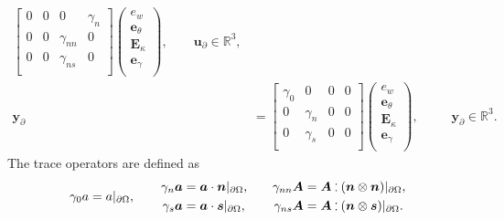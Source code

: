 \begin{subequations}
\begin{align}
	\begin{bmatrix}
	{0} &  {0} & {0} & \gamma_{n} \\
	{0} &  {0} & \gamma_{nn} & {0} \\
	{0} &  {0} & \gamma_{ns} & {0} \\
	\end{bmatrix}
\begin{pmatrix}
e_w \\
\bm{e}_{\theta} \\
\bm{E}_{\kappa} \\
\bm{e}_{\gamma} \\
\end{pmatrix}, \qquad \bm{u}_\partial \in \mathbb{R}^3, \\
\bm{y}_\partial &= 
	\begin{bmatrix}
	\gamma_{0} & {0} & {0} & {0} \\
	{0} & \gamma_{n} & {0} & {0} \\
	{0} & \gamma_{s} & {0} & {0} \\
	\end{bmatrix}
\begin{pmatrix}
e_w \\
\bm{e}_{\theta} \\
\bm{E}_{\kappa} \\
\bm{e}_{\gamma} \\
\end{pmatrix}, \qquad\;\; \bm{y}_\partial \in \mathbb{R}^3.
\end{align}
\end{subequations}
The trace operators are defined as
\begin{equation}
\gamma_{0}a = a\vert_{\partial\Omega}, \qquad
\begin{aligned}
\gamma_{n}\bm{a} &= \bm{a} \cdot \bm{n}\vert_{\partial\Omega}, \\
\gamma_{s}\bm{a} &= \bm{a} \cdot \bm{s}\vert_{\partial\Omega},
\end{aligned}  \qquad 
\begin{aligned}
\gamma_{nn}\bm{A} &= \bm{A} \cddot (\bm{n} \otimes \bm{n})\vert_{\partial\Omega}, \\
\gamma_{ns}\bm{A} &= \bm{A} \cddot (\bm{n} \otimes \bm{s})\vert_{\partial\Omega}.
\end{aligned}
\end{equation}

